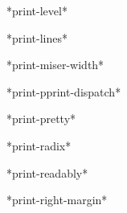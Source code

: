 \begin{variable}{*print-level*}{}
  
\end{variable}

\begin{variable}{*print-lines*}{}
  
\end{variable}

\begin{variable}{*print-miser-width*}{}
  
\end{variable}

\begin{variable}{*print-pprint-dispatch*}{}
  
\end{variable}

\begin{variable}{*print-pretty*}{}
  
\end{variable}

\begin{variable}{*print-radix*}{}
  
\end{variable}

\begin{variable}{*print-readably*}{}
  
\end{variable}

\begin{variable}{*print-right-margin*}{}
  
\end{variable}


